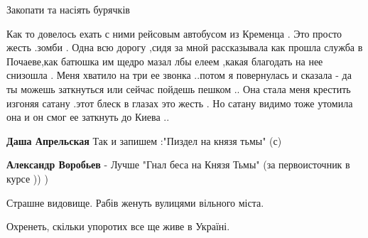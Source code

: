 \begin{itemize}
Закопати та насіять бурячків 🌵

 
Как то довелось ехать с ними рейсовым автобусом из Кременца .
Это просто жесть .зомби .
Одна всю дорогу ,сидя за мной рассказывала как прошла служба в Почаеве,как батюшка им щедро мазал лбы елеем ,какая благодать на нее снизошла .
Меня хватило на три ее звонка ..потом я повернулась и сказала - да ты можешь заткнуться или сейчас пойдешь пешком ..
Она стала меня крестить изгоняя сатану .этот блеск в глазах это жесть .
Но сатану видимо тоже утомила она и он смог ее заткнуть до Киева ..

\begin{itemize}
 
\textbf{Даша Апрельская}
Так и запишем :"Пиздел на князя тьмы" (с)

 
\textbf{Александр Воробьев} - Лучше "Гнал беса на Князя Тьмы"
(за первоисточник в курсе )) )
\end{itemize}

 
Страшне видовище. Рабів женуть вулицями вільного міста.

 
Охренеть, скільки упоротих все ще живе в Україні.


\end{itemize}
